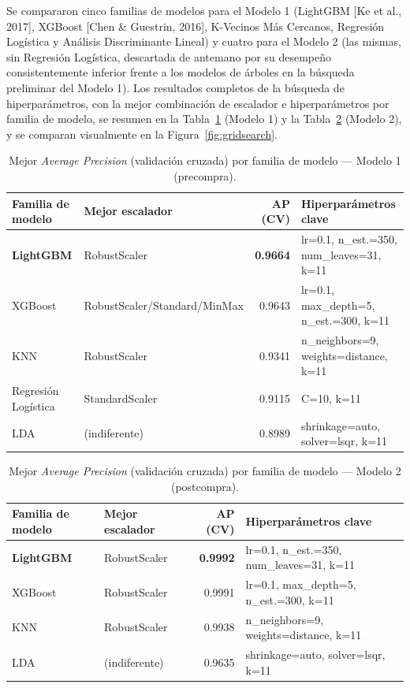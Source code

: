 \documentclass[11pt,letterpaper]{article}
\begin{document}
Se compararon cinco familias de modelos para el Modelo 1 (LightGBM [Ke et al., 2017], XGBoost [Chen \& Guestrin, 2016], K-Vecinos Más Cercanos, Regresión Logística y Análisis Discriminante Lineal) y cuatro para el Modelo 2 (las mismas, sin Regresión Logística, descartada de antemano por su desempeño consistentemente inferior frente a los modelos de árboles en la búsqueda preliminar del Modelo 1). Los resultados completos de la búsqueda de hiperparámetros, con la mejor combinación de escalador e hiperparámetros por familia de modelo, se resumen en la Tabla~\ref{tab:grid1} (Modelo 1) y la Tabla~\ref{tab:grid2} (Modelo 2), y se comparan visualmente en la Figura~\ref{fig:gridsearch}.

\begin{table}[h!]
\centering
\small
\caption{Mejor \textit{Average Precision} (validación cruzada) por familia de modelo --- Modelo 1 (precompra).}
\label{tab:grid1}
\begin{tabular}{@{}llrl@{}}
\toprule
Familia de modelo & Mejor escalador & AP (CV) & Hiperparámetros clave \\
\midrule
\textbf{LightGBM} & RobustScaler & \textbf{0.9664} & lr=0.1, n\_est.=350, num\_leaves=31, k=11 \\
XGBoost & RobustScaler/Standard/MinMax & 0.9643 & lr=0.1, max\_depth=5, n\_est.=300, k=11 \\
KNN & RobustScaler & 0.9341 & n\_neighbors=9, weights=distance, k=11 \\
Regresión Logística & StandardScaler & 0.9115 & C=10, k=11 \\
LDA & (indiferente) & 0.8989 & shrinkage=auto, solver=lsqr, k=11 \\
\bottomrule
\end{tabular}
\end{table}

\begin{table}[h!]
\centering
\small
\caption{Mejor \textit{Average Precision} (validación cruzada) por familia de modelo --- Modelo 2 (postcompra).}
\label{tab:grid2}
\begin{tabular}{@{}llrl@{}}
\toprule
Familia de modelo & Mejor escalador & AP (CV) & Hiperparámetros clave \\
\midrule
\textbf{LightGBM} & RobustScaler & \textbf{0.9992} & lr=0.1, n\_est.=350, num\_leaves=31, k=11 \\
XGBoost & RobustScaler & 0.9991 & lr=0.1, max\_depth=5, n\_est.=300, k=11 \\
KNN & RobustScaler & 0.9938 & n\_neighbors=9, weights=distance, k=11 \\
LDA & (indiferente) & 0.9635 & shrinkage=auto, solver=lsqr, k=11 \\
\bottomrule
\end{tabular}
\end{table}
\end{document}
